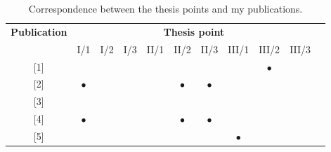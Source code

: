 \documentclass[12pt,a4paper]{extarticle}
\begin{document}
\begin{table}[h!]
\centering
\caption{Correspondence between the thesis points and my publications.}
\label{tab:summary_table}
\begin{tabular}{|c|c|c|c|c|c|c|c|c|c|c|}
\hline
\multirow{2}{*}{\textbf{Publication}} & \multicolumn{9}{c|}{\textbf{Thesis point}}                                                                                                                                                                                                                                        \\
                                      & \multicolumn{1}{c|}{I/1}       & \multicolumn{1}{c|}{I/2}       & \multicolumn{1}{c|}{I/3}       & \multicolumn{1}{c|}{II/1}      & \multicolumn{1}{c|}{II/2}      & \multicolumn{1}{c|}{II/3}      & \multicolumn{1}{c|}{III/1}     & \multicolumn{1}{c|}{III/2}     & III/3     \\ \hline
{[}1{]}                               & \multicolumn{1}{c|}{}          & \multicolumn{1}{c|}{}          & \multicolumn{1}{c|}{}          & \multicolumn{1}{c|}{}          & \multicolumn{1}{c|}{}          & \multicolumn{1}{c|}{}          & \multicolumn{1}{c|}{}          & \multicolumn{1}{c|}{$\bullet$} &           \\ \hline
{[}2{]}                               & \multicolumn{1}{c|}{$\bullet$} & \multicolumn{1}{c|}{}          & \multicolumn{1}{c|}{}          & \multicolumn{1}{c|}{}          & \multicolumn{1}{c|}{$\bullet$} & \multicolumn{1}{c|}{$\bullet$} & \multicolumn{1}{c|}{}          & \multicolumn{1}{c|}{}          &           \\ \hline
{[}3{]}                               & \multicolumn{1}{c|}{}          & \multicolumn{1}{c|}{}          & \multicolumn{1}{c|}{}          & \multicolumn{1}{c|}{}          & \multicolumn{1}{c|}{}          & \multicolumn{1}{c|}{}          & \multicolumn{1}{c|}{}          & \multicolumn{1}{c|}{}          &           \\ \hline
{[}4{]}                               & \multicolumn{1}{c|}{$\bullet$} & \multicolumn{1}{c|}{}          & \multicolumn{1}{c|}{}          & \multicolumn{1}{c|}{}          & \multicolumn{1}{c|}{$\bullet$} & \multicolumn{1}{c|}{$\bullet$} & \multicolumn{1}{c|}{}          & \multicolumn{1}{c|}{}          &           \\ \hline
{[}5{]}                               & \multicolumn{1}{c|}{}          & \multicolumn{1}{c|}{}          & \multicolumn{1}{c|}{}          & \multicolumn{1}{c|}{}          & \multicolumn{1}{c|}{}          & \multicolumn{1}{c|}{}          & \multicolumn{1}{c|}{$\bullet$} & \multicolumn{1}{c|}{}          &           \\ \hline

\end{tabular}
\end{table}
\end{document}
